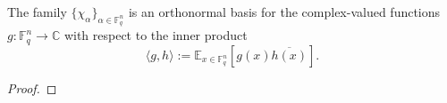 \begin{theorem}
\label{lem:ff-characters-orthonormal}
\leanok
The family $\{\chi_\alpha\}_{\alpha \in \mathbb{F}_q^n}$ is an
  orthonormal basis for the complex-valued functions
  $g : \mathbb{F}_q^n \to \mathbb{C}$ with respect to the inner product
  \[
    \langle g,h\rangle := \mathbb{E}_{x \in \mathbb{F}_q^n}[g(x)\overline{h(x)}].
  \]
\end{theorem}
\begin{proof}
\end{proof}
